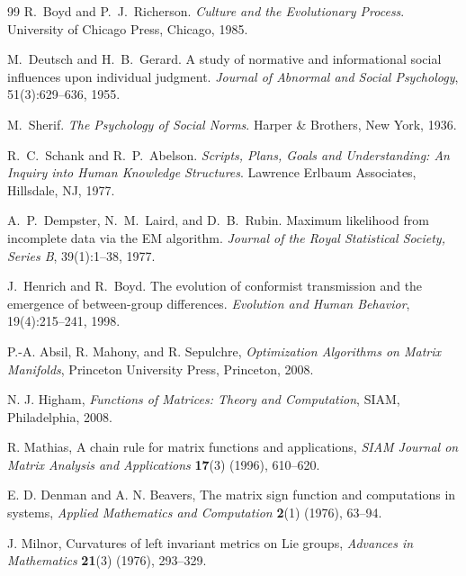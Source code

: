 \documentclass[11pt]{article}
\theoremstyle{definition}
\theoremstyle{remark}
\begin{document}
\begin{thebibliography}{99}
R.~Boyd and P.~J.~Richerson.
\newblock \emph{Culture and the Evolutionary Process}.
\newblock University of Chicago Press, Chicago, 1985.

M.~Deutsch and H.~B.~Gerard.
\newblock A study of normative and informational social influences upon individual judgment.
\newblock \emph{Journal of Abnormal and Social Psychology}, 51(3):629--636, 1955.

M.~Sherif.
\newblock \emph{The Psychology of Social Norms}.
\newblock Harper \& Brothers, New York, 1936.

R.~C.~Schank and R.~P.~Abelson.
\newblock \emph{Scripts, Plans, Goals and Understanding: An Inquiry into Human Knowledge Structures}.
\newblock Lawrence Erlbaum Associates, Hillsdale, NJ, 1977.

A.~P.~Dempster, N.~M.~Laird, and D.~B.~Rubin.
\newblock Maximum likelihood from incomplete data via the {EM} algorithm.
\newblock \emph{Journal of the Royal Statistical Society, Series B}, 39(1):1--38, 1977.

J.~Henrich and R.~Boyd.
\newblock The evolution of conformist transmission and the emergence of between-group differences.
\newblock \emph{Evolution and Human Behavior}, 19(4):215--241, 1998.

P.-A. Absil, R. Mahony, and R. Sepulchre, \emph{Optimization Algorithms on Matrix Manifolds}, Princeton University Press, Princeton, 2008.

N. J. Higham, \emph{Functions of Matrices: Theory and Computation}, SIAM, Philadelphia, 2008.

R. Mathias, A chain rule for matrix functions and applications, \emph{SIAM Journal on Matrix Analysis and Applications} \textbf{17}(3) (1996), 610--620.

E. D. Denman and A. N. Beavers, The matrix sign function and computations in systems, \emph{Applied Mathematics and Computation} \textbf{2}(1) (1976), 63--94.

J. Milnor, Curvatures of left invariant metrics on Lie groups, \emph{Advances in Mathematics} \textbf{21}(3) (1976), 293--329.


\end{thebibliography}
\end{document}
